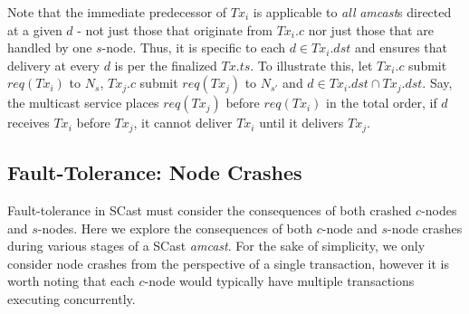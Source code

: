 \begin{description}
		Note that the immediate predecessor of $Tx_i$ is applicable to \emph{all} \emph{amcast}s directed at a given $d$ - not just those that originate from $Tx_i.c$ nor just those that are handled by one $s$-node. Thus, it is specific to each $d \in Tx_i.dst$ and ensures that delivery at every $d$ is per the finalized $Tx.ts$.  To illustrate this, let $Tx_i.c$ submit $req(Tx_i)$ to $N_s$, $Tx_j.c$ submit $req(Tx_j)$ to $N_{s'}$ and $d \in Tx_i.dst \cap Tx_j.dst$. Say, the multicast service places $req(Tx_j)$ before $req(Tx_i)$ in the total order, if $d$ receives $Tx_i$ before $Tx_j$, it cannot deliver $Tx_i$ until it delivers $Tx_j$.
    \end{description}

	\subsection{Fault-Tolerance: Node Crashes}\label{ssec:scast_fault_tolerance}
	Fault-tolerance in \textsf{SCast} must consider the consequences of both crashed $c$-nodes and $s$-nodes.  Here we explore the consequences of both $c$-node and $s$-node crashes during various stages of a \textsf{SCast} \emph{amcast}.  For the sake of simplicity, we only consider node crashes from the perspective of a single transaction, however it is worth noting that each $c$-node would typically have multiple transactions executing concurrently.  
	
